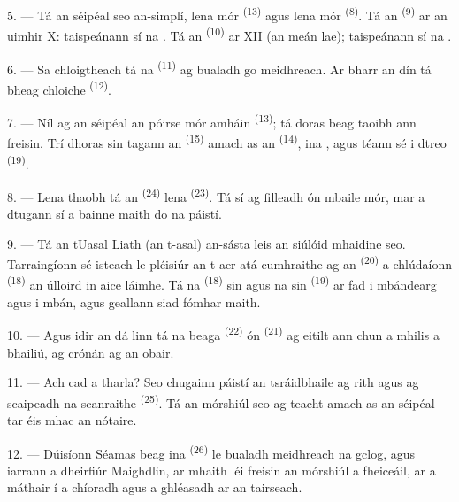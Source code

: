 \VUsaut{3.4mm}
\VUsaut{3.0mm}

5. --- Tá an séipéal seo an-simplí, lena  mór
\textsuperscript{(13)} agus lena  mór \textsuperscript{(8)}. Tá an
 \textsuperscript{(9)} ar an uimhir X: taispeánann sí na
. Tá an  \textsuperscript{(10)} ar XII (an
meán lae); taispeánann sí na .

6. --- Sa chloigtheach tá na  \textsuperscript{(11)} ag bualadh go
meidhreach. Ar bharr an dín tá  bheag chloiche \textsuperscript{(12)}.

7. --- Níl ag an séipéal an póirse mór amháin \textsuperscript{(13)}; tá doras beag
taoibh ann freisin. Trí dhoras sin tagann an 
\textsuperscript{(15)} amach as an  \textsuperscript{(14)}, ina
, agus téann sé i dtreo 
\textsuperscript{(19)}.

8. --- Lena thaobh tá an  \textsuperscript{(24)} lena
 \textsuperscript{(23)}. Tá sí ag filleadh ón mbaile mór, mar a
dtugann sí a bainne maith do na páistí.

\VUsaut{4.0mm}
\VUsaut{3.4mm}

9. --- Tá an tUasal Liath (an t-asal) an-sásta leis an siúlóid mhaidine seo.
Tarraingíonn sé isteach le pléisiúr an t-aer atá cumhraithe ag an 
\textsuperscript{(20)} a chlúdaíonn  \textsuperscript{(18)}
an úlloird in aice láimhe. Tá na 
\textsuperscript{(18)} sin agus na  sin \textsuperscript{(19)} ar
fad i mbándearg agus i mbán, agus geallann siad fómhar maith.

10. --- Agus idir an dá linn tá na  beaga \textsuperscript{(22)} ón
 \textsuperscript{(21)} ag eitilt ann chun a  mhilis
a bhailiú, ag crónán ag an obair.

11. --- Ach cad a tharla? Seo chugainn páistí an tsráidbhaile ag rith agus ag
scaipeadh na  scanraithe \textsuperscript{(25)}. Tá an mórshiúl seo
ag teacht amach as an séipéal tar éis  mhac an nótaire.

12. --- Dúisíonn Séamas beag ina  \textsuperscript{(26)} le
bualadh meidhreach na gclog, agus iarrann a dheirfiúr Maighdlin, ar mhaith léi
freisin an mórshiúl a fheiceáil, ar a máthair í a chíoradh agus a ghléasadh ar an
tairseach.

